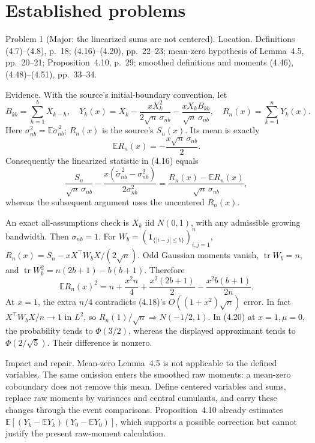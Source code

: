 \documentclass[10pt]{article}
\begin{document}
\section*{Established problems}
Problem 1 (Major: the linearized sums are not centered).  Location. Definitions (4.7)–(4.8), p. 18; (4.16)–(4.20), pp. 22–23; mean-zero hypothesis of Lemma 4.5, pp. 20–21; Proposition 4.10, p. 29; smoothed definitions and moments (4.46), (4.48)–(4.51), pp. 33–34.\par
Evidence. With the source’s initial-boundary convention, let \[B_{kb}=\sum_{h=1}^bX_{k-h},\quad
Y_k(x)=X_k-\frac{xX_k^2}{2\sqrt n\,\sigma_{nb}}
             -\frac{xX_kB_{kb}}{\sqrt n\,\sigma_{nb}},\quad
R_n(x)=\sum_{k=1}^nY_k(x).\] Here \(\sigma_{nb}^2=\mathbb E\widetilde\sigma_{nb}^{\,2}\); \(R_n(x)\) is the source’s \(S_n(x)\). Its mean is exactly \[\mathbb ER_n(x)=-\frac{x\sqrt n\,\sigma_{nb}}2 .\] Consequently the linearized statistic in (4.16) equals \[\frac{S_n}{\sqrt n\,\sigma_{nb}}
-\frac{x(\widetilde\sigma_{nb}^{\,2}-\sigma_{nb}^2)}{2\sigma_{nb}^2}
=\frac{R_n(x)-\mathbb ER_n(x)}{\sqrt n\,\sigma_{nb}},                    \tag{2.1}\] whereas the subsequent argument uses the uncentered \(R_n(x)\).\par
An exact all-assumptions check is \(X_k\) iid \(N(0,1)\), with any admissible growing bandwidth. Then \(\sigma_{nb}=1\). For \(W_b=(\mathbf1_{\{|i-j|\le b\}})_{i,j=1}^n\), \(R_n(x)=S_n-xX^\top W_bX/(2\sqrt n)\). Odd Gaussian moments vanish, \(\operatorname{tr}W_b=n\), and \(\operatorname{tr}W_b^2=n(2b+1)-b(b+1)\). Therefore \[\mathbb ER_n(x)^2
=n+\frac{x^2n}{4}+\frac{x^2(2b+1)}2-\frac{x^2b(b+1)}{2n}.          \tag{2.2}\] At \(x=1\), the extra \(n/4\) contradicts (4.18)’s \(O((1+x^2)\sqrt n)\) error. In fact \(X^\top W_bX/n\to1\) in \(L^2\), so \(R_n(1)/\sqrt n\Rightarrow N(-1/2,1)\). In (4.20) at \(x=1,\mu=0\), the probability tends to \(\Phi(3/2)\), whereas the displayed approximant tends to \(\Phi(2/\sqrt5)\). Their difference is nonzero.\par
Impact and repair. Mean-zero Lemma 4.5 is not applicable to the defined variables. The same omission enters the smoothed raw moments: a mean-zero coboundary does not remove this mean. Define centered variables and sums, replace raw moments by variances and central cumulants, and carry these changes through the event comparisons. Proposition 4.10 already estimates \(\mathbb E[(Y_k-\mathbb EY_k)(Y_0-\mathbb EY_0)]\), which supports a possible correction but cannot justify the present raw-moment calculation.\par
\end{document}

